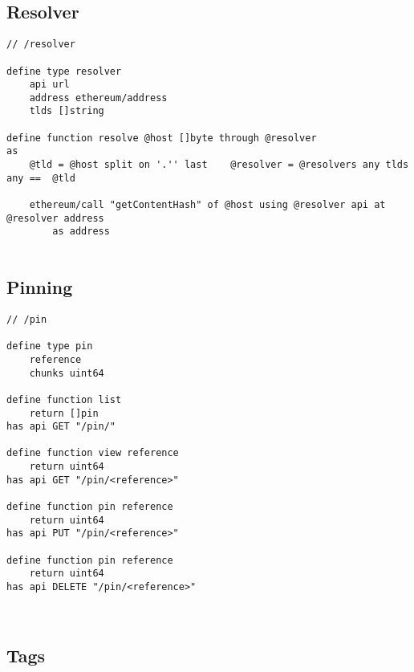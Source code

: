 \subsection{Resolver}\label{spec:format:resolver}


\begin{definition}[Resolver]\label{def:resolver}
\begin{lstlisting}[language=buzz1]
// /resolver

define type resolver 
    api url
    address ethereum/address
    tlds []string 

define function resolve @host []byte through @resolver
as
    @tld = @host split on '.'' last    @resolver = @resolvers any tlds any ==  @tld
        
    ethereum/call "getContentHash" of @host using @resolver api at @resolver address
        as address
                     
\end{lstlisting}
\end{definition}




\subsection{Pinning}\label{spec:format:pinning}


\begin{definition}[Pinning]\label{def:pinning}
\begin{lstlisting}[language=buzz1]
// /pin

define type pin
    reference
    chunks uint64
    
define function list
    return []pin
has api GET "/pin/"

define function view reference
    return uint64
has api GET "/pin/<reference>"
    
define function pin reference
    return uint64
has api PUT "/pin/<reference>"

define function pin reference
    return uint64
has api DELETE "/pin/<reference>"
    
       
\end{lstlisting}
\end{definition}



\subsection{Tags}\label{spec:format:tags}


